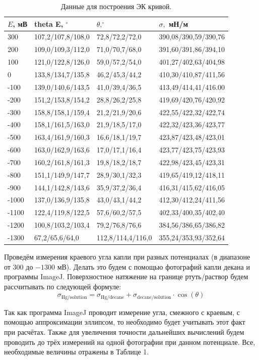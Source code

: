 \documentclass[a4paper, 11pt]{article}%
\begin{document}
\begin{table}[h!]
\centering
\caption{Данные для построения ЭК кривой.}
\begin{tabular}{|l|l|l|l|}
\hline
$E$, мВ & theta E, $^\circ$ & $\theta, ^\circ$ & $\sigma,$ мН/м      \\ \hline
300     & 107,2/107,8/108,0 & 72,8/72,2/72,0   & 390,08/390,59/390,76\\ \hline
200     & 109,0/109,3/112,0 & 71,0/70,7/68,0   & 391,60/391,86/394,10\\ \hline
100     & 121,0/122,8/126,0 & 59,0/57,2/54,0   & 401,27/402,63/404,98\\ \hline
0       & 133,8/134,7/135,8 & 46,2/45,3/44,2   & 410,30/410,87/411,56\\ \hline
-100    & 139,0/140,6/143,5 & 41,0/39,4/36,5   & 413,49/414,41/416.00\\ \hline
-200    & 151,2/153,8/154,2 & 28,8/26,2/25,8   & 419,69/420,76/420,92\\ \hline
-300    & 158,8/158,1/159,4 & 21,2/21,9/20,6   & 422,55/422,32/422,74\\ \hline
-400    & 158,1/161,5/163,0 & 21,9/18,5/17,0   & 422,32/423,36/423,77\\ \hline
-500    & 163,4/161,9/160,3 & 16,6/18,1/19,7   & 423,87/423,48/423,01\\ \hline
-600    & 163,0/162,9/163,6 & 17,0/17,1/16,4   & 423,77/423,75/423,93\\ \hline
-700    & 160,2/161,8/161,3 & 19,8/18,2/18,7   & 422,98/423,45/423,31\\ \hline
-800    & 151,1/149,9/147,7 & 28,9/30,1/32,3   & 419,65/419,12/418,11\\ \hline
-900    & 144,1/142,8/143,6 & 35,9/37,2/36,4   & 416,31/415,62/416,05\\ \hline
-1000   & 137,0/136,9/135,8 & 43,0/43,1/44,2   & 412,30/412,24/411,56\\ \hline
-1100   & 122,4/119,8/122,5 & 57,6/60,2/57,5   & 402,33/400,35/402,40\\ \hline
-1200   & 100,8/103,2/103,4 & 79,2/76,8/76,6   & 384,56/386,65/386,82\\ \hline
-1300   & 67,2/65,6/64,0    & 112,8/114,4/116,0& 355,24/353,93/352,64\\ \hline
\end{tabular}
\end{table}
\par Проведём измерения краевого угла капли при разных потенциалах (в диапазоне от $300$ до $ -1300$ мВ). Делать это будем с помощью фотографий капли декана и программы ImageJ. Поверхностное натяжение на границе ртуть/раствор будем рассчитывать по следующей формуле:
$$\sigma_\text{Hg/solution} = \sigma_\text{Hg/decane} + \sigma_\text{decane/solution}\cdot \cos(\theta)$$
\par Так как программа ImageJ проводит измерение угла, смежного с краевым, с помощью аппроксимации эллипсом, то необходимо будет учитывать этот факт при расчётах. Также для увеличения точности дальнейших вычислений будем проводить до трёх измерений на одной фотографии при данном потенциале. Все, необходимые величины отражены в Таблице 1.
\end{document}
